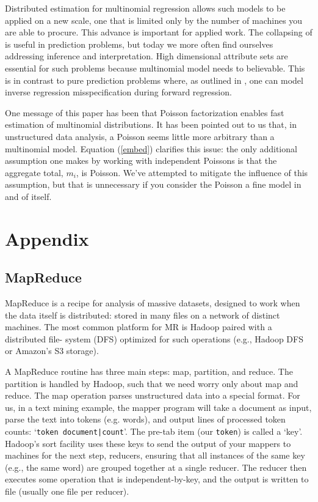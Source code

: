 \documentclass[12pt]{article}
\newcommand{\cd}[1]{{\tt#1}}
\begin{document}
Distributed estimation for multinomial regression allows such models to be applied on a new  scale, one that is limited only by the
number of machines you are able to procure. This advance is important for applied
work.  The collapsing of
\cite{taddy_multinomial_2013} is useful in prediction problems, but today
we more often find ourselves addressing inference and interpretation.  High dimensional
attribute sets are essential for such problems because multinomial model needs
to believable. This is in contrast to pure prediction problems where, as
outlined in \cite{taddy_rejoinder:_2013}, one can model inverse regression
misspecification during forward regression.

One message of this paper has been that Poisson factorization
enables fast estimation of multinomial distributions.  It has been pointed out
to us that, in unstructured data analysis, a Poisson seems little more
arbitrary than a multinomial model.  Equation (\ref{embed}) clarifies this
issue:  the only additional assumption one makes by working with independent
Poissons is that the aggregate total, $m_i$, is Poisson.  We've attempted to
mitigate the influence of this assumption, but that is unnecessary if you
consider the Poisson a fine model in and of itself.

\appendix
\section{Appendix}

\subsection{MapReduce} 
\label{MR}

  MapReduce \citep[MR;][]{dean_mapreduce:_2004} is a  recipe
for analysis of massive datasets, designed to work when the data itself is
distributed: stored in many files on a network of distinct machines.
The most common platform for  MR is Hadoop paired with a distributed file-
system (DFS)  optimized for such operations (e.g., Hadoop DFS or
Amazon's S3 storage).

A MapReduce routine has three main steps: map, partition, and reduce.  The
partition  is handled by Hadoop, such that we need worry only
about map and reduce.  The map operation parses  unstructured data into a
special format.  For us, in a text mining example, the mapper program will
take a document as input, parse the text into tokens (e.g. words), and output
lines of processed token counts: `\cd{token   document|count}'.  The pre-tab
item (our \cd{token}) is called a `key'.  Hadoop's sort facility uses these
keys to send the output of your mappers to machines for the next step,
reducers, ensuring that all instances of the same key (e.g., the same word)
are grouped together at a single reducer.  The reducer then executes some
operation that is independent-by-key, and the output is written to file
(usually one file per reducer).
\end{document}
